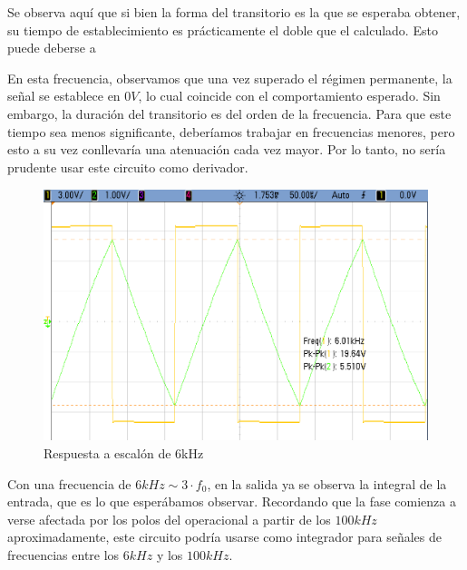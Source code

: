 \documentclass[../../tc_tp3_main.tex]{subfiles}
\begin{document}
Se observa aqu\'i que si bien la forma del transitorio es la que se esperaba obtener, su tiempo de establecimiento es pr\'acticamente el doble que el calculado. Esto puede deberse a


En esta frecuencia, observamos que una vez superado el r\'egimen permanente, la se\~nal se establece en $0V$, lo cual coincide con el comportamiento esperado. Sin embargo, la duraci\'on del transitorio es del orden de la frecuencia. Para que este tiempo sea menos significante, deber\'iamos trabajar en frecuencias menores, pero esto a su vez conllevar\'ia una atenuaci\'on cada vez mayor. Por lo tanto, no ser\'ia prudente usar este circuito como derivador.

\begin{figure}[H]
	\centering
  	\includegraphics[scale = 0.3]{imagenes/tc_tp3_ej1_6kHz.png}
  	\caption{Respuesta a escal\'on de 6kHz}
  	\label{fig:1-rtaesc-6kHz}
\end{figure}

Con una frecuencia de $6kHz \sim 3\cdot f_0$, en la salida ya se observa la integral de la entrada, que es lo que esper\'abamos observar. Recordando que la fase comienza a  verse afectada por los polos del operacional a partir de los $100kHz$ aproximadamente, este circuito podr\'ia usarse como integrador para se\~nales de frecuencias entre los $6kHz$ y los $100kHz$.
\end{document}
